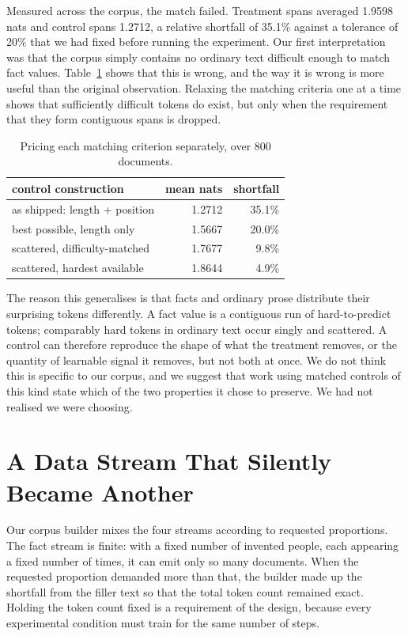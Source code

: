 \documentclass[10pt,twocolumn]{article}
\begin{document}
Measured across the corpus, the match failed. Treatment spans averaged 1.9598
nats and control spans 1.2712, a relative shortfall of 35.1\% against a
tolerance of 20\% that we had fixed before running the experiment. Our first
interpretation was that the corpus simply contains no ordinary text difficult
enough to match fact values. Table~\ref{tab:ctrl} shows that this is wrong, and
the way it is wrong is more useful than the original observation. Relaxing the
matching criteria one at a time shows that sufficiently difficult tokens do
exist, but only when the requirement that they form contiguous spans is
dropped.

\begin{table}[h]
\centering\small
\begin{tabular}{lrr}
\toprule
control construction & mean nats & shortfall \\
\midrule
as shipped: length + position & 1.2712 & 35.1\% \\
best possible, length only & 1.5667 & 20.0\% \\
scattered, difficulty-matched & 1.7677 & 9.8\% \\
scattered, hardest available & 1.8644 & 4.9\% \\
\bottomrule
\end{tabular}
\caption{Pricing each matching criterion separately, over 800 documents.}
\label{tab:ctrl}
\end{table}

The reason this generalises is that facts and ordinary prose distribute their
surprising tokens differently. A fact value is a contiguous run of hard-to-predict
tokens; comparably hard tokens in ordinary text occur singly and scattered. A
control can therefore reproduce the shape of what the treatment removes, or the
quantity of learnable signal it removes, but not both at once. We do not think
this is specific to our corpus, and we suggest that work using matched controls
of this kind state which of the two properties it chose to preserve. We had not
realised we were choosing.

\section{A Data Stream That Silently Became Another}
\label{sec:mix}

Our corpus builder mixes the four streams according to requested proportions.
The fact stream is finite: with a fixed number of invented people, each
appearing a fixed number of times, it can emit only so many documents. When the
requested proportion demanded more than that, the builder made up the shortfall
from the filler text so that the total token count remained exact. Holding the
token count fixed is a requirement of the design, because every experimental
condition must train for the same number of steps.
\end{document}
